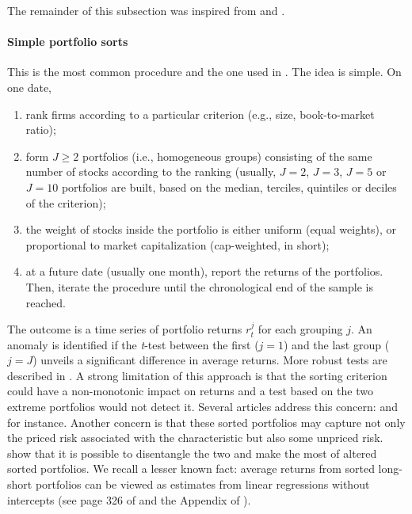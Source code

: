 The remainder of this subsection was inspired from \cite{baker2017detecting} and \cite{harvey2017lucky}.

\paragraph{Simple portfolio sorts}

This is the most common procedure and the one used in \cite{fama1992cross}. The idea is simple. On one date,

\begin{enumerate}
\item rank firms according to a particular criterion (e.g., size, book-to-market ratio);
\item form $J\ge 2$ portfolios (i.e., homogeneous groups) consisting of the same number of stocks according to the ranking (usually, $J=2$, $J=3$, $J=5$ or $J=10$ portfolios are built, based on the median, terciles, quintiles or deciles of the criterion);
\item the weight of stocks inside the portfolio is either uniform (equal weights), or proportional to market capitalization (cap-weighted, in short);
\item at a future date (usually one month), report the returns of the portfolios. Then, iterate the procedure until the chronological end of the sample is reached.
\end{enumerate}

The outcome is a time series of portfolio returns $r_t^j$ for each grouping $j$. An anomaly is identified if the \textit{t}-test between the first ($j=1$) and the last group ($j=J$) unveils a significant difference in average returns. More robust tests are described in \cite{cattaneo2019characteristic}. A strong limitation of this approach is that the sorting criterion could have a non-monotonic impact on returns and a test based on the two extreme portfolios would not detect it. Several articles address this concern: \cite{patton2010monotonicity} and \cite{romano2013testing} for instance. Another concern is that these sorted portfolios may capture not only the priced risk associated with the characteristic but also some unpriced risk. \cite{daniel2020cross} show that it is possible to disentangle the two and make the most of altered sorted portfolios. We recall a lesser known fact: average returns from sorted long-short portfolios can be viewed as estimates from linear regressions without intercepts (see page 326 of \cite{fama1976foundations} and the Appendix of \cite{freyberger2020dissecting}).

